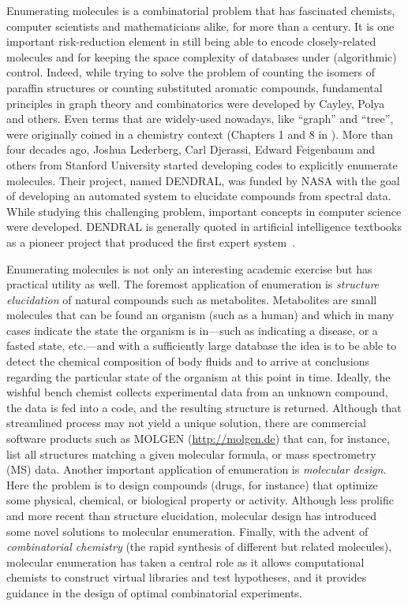 \documentclass{sig-alternate}
\begin{document}
Enumerating molecules is a combinatorial problem that has fascinated
chemists, computer scientists and mathematicians alike, for more than a
century. It is one important risk-reduction element in still being
able to encode closely-related molecules and for keeping the space
complexity of databases under (algorithmic) control. Indeed, while
trying to solve the problem of counting the isomers of paraffin
structures or counting substituted aromatic compounds, fundamental
principles in graph theory and combinatorics were developed by Cayley,
Polya and others. Even terms that are widely-used nowadays, like ``graph''
and ``tree'', were originally coined in a chemistry context (Chapters 1 and
8 in \cite{faulon2010}). More than four decades ago, Joshua Lederberg,
Carl Djerassi, Edward Feigenbaum and others from Stanford University
started developing codes to explicitly enumerate molecules. Their
project, named DENDRAL, was funded by NASA with the goal of developing
an automated system to elucidate compounds from spectral data. While
studying this challenging problem, important concepts in computer
science were developed. DENDRAL is generally quoted in artificial
intelligence textbooks as a pioneer project that produced the first
expert system~\cite{DENDRAL}.

Enumerating molecules is not only an interesting academic exercise but has
practical utility as well. The foremost application of enumeration is \emph{structure
elucidation} of natural compounds such as metabolites. Metabolites are small molecules that can be found an organism
(such as a human) and which in many cases indicate the state the organism is in---such as indicating a disease, or a
fasted state, etc.---and with a sufficiently large database the idea is to be able to detect the chemical composition of
body fluids and to arrive at conclusions regarding the particular state of the organism at this point in time.
Ideally, the wishful bench chemist collects experimental data
from an unknown compound, the data is fed into a code, and the resulting
structure is returned. Although that streamlined process may not yield a unique
solution, there are commercial software products such as MOLGEN
(\url{http://molgen.de}) that can, for instance, list all structures matching a given
molecular formula, or mass spectrometry (MS) data. Another important application
of enumeration is \emph{molecular design}. Here the problem is to design compounds
(drugs, for instance) that optimize some physical, chemical, or biological
property or activity. Although less prolific and more recent than structure
elucidation, molecular design has introduced some novel solutions to molecular
enumeration. Finally, with the advent of \emph{combinatorial chemistry} (the rapid synthesis of different but related molecules), molecular
enumeration has taken a central role as it allows computational chemists to
construct virtual libraries and test hypotheses, and it provides guidance in the
design of optimal combinatorial experiments.
\end{document}
